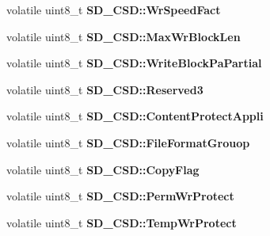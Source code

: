 \begin{DoxyCompactItemize}
\item 
volatile uint8\+\_\+t {\bfseries S\+D\+\_\+\+C\+S\+D\+::\+Wr\+Speed\+Fact}\hypertarget{group__sd__card_gafddd7e2be79a4b5386434b912bd0f825}{}\label{group__sd__card_gafddd7e2be79a4b5386434b912bd0f825}

\item 
volatile uint8\+\_\+t {\bfseries S\+D\+\_\+\+C\+S\+D\+::\+Max\+Wr\+Block\+Len}\hypertarget{group__sd__card_gaa9386e7249e876d1ce6c3cbfe605e93c}{}\label{group__sd__card_gaa9386e7249e876d1ce6c3cbfe605e93c}

\item 
volatile uint8\+\_\+t {\bfseries S\+D\+\_\+\+C\+S\+D\+::\+Write\+Block\+Pa\+Partial}\hypertarget{group__sd__card_gae4e1e8b0ab14e493939f879297ffdbbe}{}\label{group__sd__card_gae4e1e8b0ab14e493939f879297ffdbbe}

\item 
volatile uint8\+\_\+t {\bfseries S\+D\+\_\+\+C\+S\+D\+::\+Reserved3}\hypertarget{group__sd__card_gafe043702fb9818d6f24d34371fda3025}{}\label{group__sd__card_gafe043702fb9818d6f24d34371fda3025}

\item 
volatile uint8\+\_\+t {\bfseries S\+D\+\_\+\+C\+S\+D\+::\+Content\+Protect\+Appli}\hypertarget{group__sd__card_gab02312218dcd28a42708b8cff49f7f0e}{}\label{group__sd__card_gab02312218dcd28a42708b8cff49f7f0e}

\item 
volatile uint8\+\_\+t {\bfseries S\+D\+\_\+\+C\+S\+D\+::\+File\+Format\+Grouop}\hypertarget{group__sd__card_gafb2d5906780ba444ca5a6eb75eeb8fee}{}\label{group__sd__card_gafb2d5906780ba444ca5a6eb75eeb8fee}

\item 
volatile uint8\+\_\+t {\bfseries S\+D\+\_\+\+C\+S\+D\+::\+Copy\+Flag}\hypertarget{group__sd__card_ga2930a617ae6630850ec062a2ceaf8762}{}\label{group__sd__card_ga2930a617ae6630850ec062a2ceaf8762}

\item 
volatile uint8\+\_\+t {\bfseries S\+D\+\_\+\+C\+S\+D\+::\+Perm\+Wr\+Protect}\hypertarget{group__sd__card_gab31b083f7a756112fae67db27d15f82a}{}\label{group__sd__card_gab31b083f7a756112fae67db27d15f82a}

\item 
volatile uint8\+\_\+t {\bfseries S\+D\+\_\+\+C\+S\+D\+::\+Temp\+Wr\+Protect}\hypertarget{group__sd__card_ga0134cfdb7840adaa39b9ca23c491ea84}{}\label{group__sd__card_ga0134cfdb7840adaa39b9ca23c491ea84}


\end{DoxyCompactItemize}

